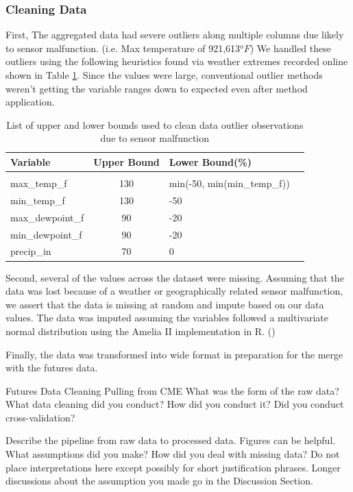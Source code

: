 \documentclass[twoside,11pt]{article}
\begin{document}
	\subsubsection{Cleaning Data}
	First, The aggregated data had severe outliers along multiple columns due likely to sensor malfunction. (i.e. Max temperature of 921,613$^oF$) We handled these outliers using the following heuristics found via weather extremes recorded online shown in Table \ref{tab:bounds}. Since the values were large, conventional outlier methods weren't getting the variable ranges down to expected even after method application.  

	\begin{table}[htbp]
		\centering
		\begin{tabular}{lclc}
			Variable & Upper Bound & Lower Bound(\%) \\
			\hline \\[-11pt]
			max\_temp\_f & 130 & min(-50, min(min\_temp\_f))\\
			min\_temp\_f & 130 & -50 \\
			max\_dewpoint\_f & 90 & -20\\
			min\_dewpoint\_f & 90 & -20\\
			precip\_in & 70 & 0\\
			\hline
		\end{tabular}
		\label{tab:bounds}
		\caption{List of upper and lower bounds used to clean data outlier observations due to sensor malfunction}
	\end{table}

	Second, several of the values across the dataset were missing. Assuming that the data was lost because of a weather or geographically related sensor malfunction, we assert that the data is missing at random and impute based on our data values. The data was imputed assuming the variables followed a multivariate normal distribution using the Amelia II implementation in R. (\cite{ameila})
	
	Finally, the data was transformed into wide format in preparation for the merge with the futures data. 


Futures Data Cleaning
  Pulling from CME
    What was the form of the raw data?
    What data cleaning did you conduct?
    How did you conduct it?
    Did you conduct cross-validation?

Describe the pipeline from raw data to processed data. Figures can be helpful. What assumptions did you make? How did you deal with missing data? Do not place interpretations here except possibly for short justification phrases. Longer discussions about the assumption you made go in the Discussion Section.
\end{document}
